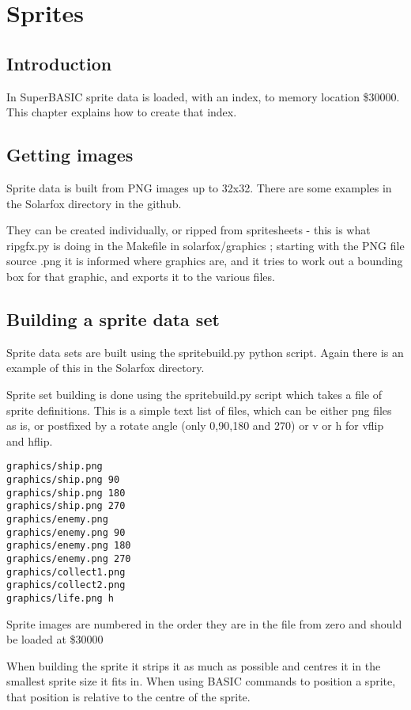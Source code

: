 \chapter{Sprites}

\section{Introduction}

In SuperBASIC sprite data is loaded, with an index, to memory location \$30000. This chapter explains how to create that index.

\section{Getting images}

Sprite data is built from PNG images up to 32x32. There are some examples in the Solarfox directory in the github.

They can be created individually, or ripped from spritesheets - this is what ripgfx.py is doing in the Makefile in solarfox/graphics ; starting with the PNG file source .png it is informed where graphics are, and it tries to work out a bounding box for that graphic, and exports it to the various files.

\section{Building a sprite data set}
	
Sprite data sets are built using the spritebuild.py python script. Again there is an example of this in the Solarfox directory.

Sprite set building is done using the spritebuild.py script which takes a file of sprite definitions. This is a simple text list of files, which can be either png files as is, or postfixed by a rotate angle (only 0,90,180 and 270) or v or h for vflip and hflip.

\begin{verbatim}
graphics/ship.png
graphics/ship.png 90
graphics/ship.png 180
graphics/ship.png 270
graphics/enemy.png
graphics/enemy.png 90
graphics/enemy.png 180
graphics/enemy.png 270
graphics/collect1.png
graphics/collect2.png
graphics/life.png h
\end{verbatim}

Sprite images are numbered in the order they are in the file from zero and should be loaded at \$30000

When building the sprite it strips it as much as possible and centres it in the smallest sprite size it fits in. When using BASIC commands to position a sprite, that position is relative to the centre of the sprite.

